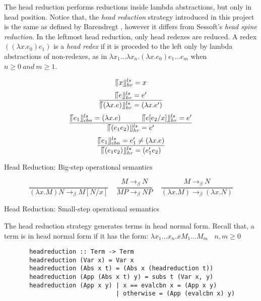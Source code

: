 The head reduction performs reductions inside lambda abstractions, but only in head position. Notice that, the \textit{head reduction} strategy introduced in this project is the same as defined by Barendregt \cite{barendregt1984lambda}, however it differs from Sessoft's \cite{sestoft2002demonstrating} \textit{head spine reduction}. In the leftmost head reduction, only head redexes are reduced. A redex $((\lambda x.e_0)e_1)$ is a \textit{head redex} if it is proceded to the left only by lambda abstractions of non-redexes, as in $\lambda x_1...\lambda x_n.(\lambda x.e_0)e_1...e_m$ when $n \geqslant 0\ and\ m \geqslant 1$.


\begin{equation*}
\llceil x \rrfloor ^{ls} _{hr} = x
\end{equation*}
\begin{equation*}
\frac{\llceil e \rrfloor ^{ls} _{hr} = e'}{\llceil (\lambda x.e) \rrfloor ^{ls} _{hr} = (\lambda x.e')}
\end{equation*}
\begin{equation*}
\frac{\llceil e_1 \rrfloor ^{ls} _{cbn} = (\lambda x.e)\ \ \ \ \ \ \ \ \ \llceil e[e_2/x] \rrfloor ^{ls} _{hr} = e'}{\llceil (e_1e_2) \rrfloor ^{ls} _{hr} = e'}
\end{equation*}
\begin{equation*}
\frac{\llceil e_1 \rrfloor ^{ls} _{cbn} = e'_1\neq (\lambda x.e)}{\llceil (e_1e_2) \rrfloor ^{ls} _{hr}  = (e'_1e_2)}
\end{equation*}
\begin{center}
Head Reduction: Big-step operational semantics
\end{center}


\begin{equation*}
\frac{}{(\lambda x.M)N \rightarrow _\beta M[N/x]}\ \ \ \ \  
\frac{M \rightarrow _\beta N}{MP \rightarrow _\beta NP}\ \ \ \ \ 
\frac{M \rightarrow _\beta N}{(\lambda x.M) \rightarrow _\beta (\lambda x.N)}
\end{equation*}
\begin{center}
Head Reduction: Small-step operational semantics
\end{center}

The head reduction strategy generates terms in head normal form. Recall that, a term is in head normal form if it has the form: $\lambda x_1\ldots x_n.xM_1\ldots M_m\ \ \ \ n,m\geqslant 0$

\begin{verbatim}
       headreduction :: Term -> Term
       headreduction (Var x) = Var x
       headreduction (Abs x t) = (Abs x (headreduction t))
       headreduction (App (Abs x t) y) = subs t (Var x, y)
       headreduction (App x y) | x == evalcbn x = (App x y)
                               | otherwise = (App (evalcbn x) y)  
\end{verbatim}

